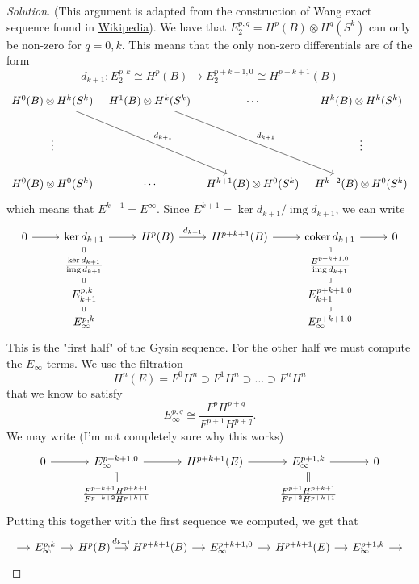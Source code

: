 \begin{proof}[Solution]\leavevmode
	(This argument is adapted from the construction of Wang exact sequence found in \href{https://en.wikipedia.org/wiki/Spectral_sequence#Wang_sequence}{Wikipedia}). We have that $E_2^{p,q}=H^{p}(B)\otimes H^{q}(S^k)$ can only be non-zero for $q=0,k$. This means that the only non-zero differentials are of the form
	\[d_{k+1}:E_2^{p,k}\cong H^{p}(B)\longrightarrow E_2^{p+k+1,0}\cong H^{p+k+1}(B)\]
	\[\begin{tikzcd}[column sep=tiny]
	H^{0}(B)\otimes H^{k}(S^k)  \arrow[rrdd,"d_{k+1}"]&H^{1}(B)\otimes H^{k}(S^k)\arrow[rrdd,"d_{k+1}"]&\cdots &H^{k}(B)\otimes H^{k}(S^k)\\
	\vdots &&&\vdots \\
	H^{0}(B)\otimes H^{0}(S^k)&\cdots&H^{k+1}(B)\otimes H^{0}(S^k)&H^{k+2}(B)\otimes H^{0}(S^k) 
\end{tikzcd}\]
which means that $E^{k+1}=E^\infty$. Since $E^{k+1}=\ker d_{k+1}/\operatorname{img} d_{k+1}$, we can write
	\[\begin{tikzcd}[row sep=tiny]
		0\arrow[r]&\ker d_{k+1}\arrow[d,equals]\arrow[r]&H^{p}(B)\arrow[r,"d_{k+1}"]&H^{p+k+1}(B)\arrow[r]&\operatorname{coker} d_{k+1}\arrow[r]\arrow[d,equals]&0\\
			  & \frac{\ker d_{k+1}}{\operatorname{img} d_{k+1}}\arrow[d,equals]&&&\frac{E^{p+k+1,0}}{\operatorname{img} d_{k+1}}\arrow[d,equal]\\
			  & E_{k+1}^{p,k}\arrow[d,equal]&&& E_{k+1}^{p+k+1,0}\arrow[d,equal]\\
		& E_\infty^{p,k}&&& E_\infty^{p+k+1,0}
	\end{tikzcd}\]
	This is the "first half" of the Gysin sequence. For the other half we must compute the $E_{\infty}$ terms. We use the filtration
	\[H^{n}(E)=F^0H^n\supset F^1H^n\supset  \ldots \supset F^nH^n\]
	that we know to satisfy
	\[E^{p,q}_{\infty}\cong \frac{F^pH^{p+q}}{F^{p+1}H^{p+q}}.\]
	We may write (I'm not completely sure why this works)
	\[\begin{tikzcd}[row sep=small]
		0\arrow[r]&E_{\infty}^{p+k+1,0}\arrow[d,equal]\arrow[r]&H^{p+k+1}(E)\arrow[r]&E^{p+1,k}_\infty\arrow[d,equal]\arrow[r]&0\\
			  &\frac{F^{p+k+1}H^{p+k+1}}{F^{p+k+2}H^{p+k+1}}&&\frac{F^{p+1}H^{p+k+1}}{F^{p+2}H^{p+k+1}}
	\end{tikzcd}\]
	Putting this together with the first sequence we computed, we get that
	\[\begin{tikzcd}[column sep=small]\leavevmode \arrow[r]&E^{p,k}_{\infty}\arrow[r]&H^{p}(B)\arrow[r,"d_{k+1}"]&H^{p+k+1}(B)\arrow[r]& E^{p+k+1,0}_\infty\arrow[r]&H^{p+k+1}(E)\arrow[r]& E_{\infty}^{p+1,k}\arrow[r]&\leavevmode\end{tikzcd}\]

\end{proof}
